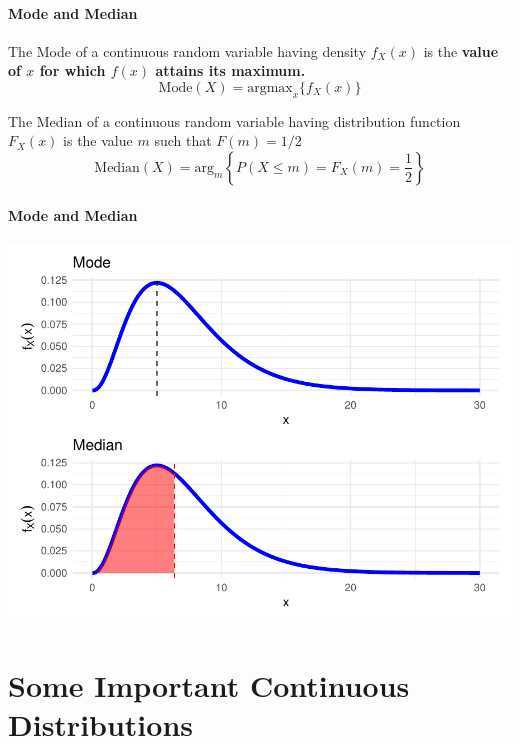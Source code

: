 \documentclass[notes=show,smaller,handout]{beamer}\usepackage[]{graphicx}\usepackage[]{color}
\newenvironment{knitrout}{}{} %
\begin{document}
\begin{frame}{\secname}
\framesubtitle{Mode and Median}
  \begin{definition}[Mode]
    The Mode of a continuous random variable having
    density $f_{X}(x)$ is the \textbf{value of $x$ for which $f(x)$ attains its maximum.}
    $$\text{Mode}(X) = \text{argmax}_{x}\{f_X(x)\}$$
  \end{definition}

  \begin{definition}[Median]
  The Median of a continuous random variable having
  distribution function $F_{X}(x)$ is the value $m$ such that $F(m) = 1/2$
  $$\text{Median}(X) = \text{arg}_{m}\left\{P(X\leq m) = F_X(m) = \frac{1}{2}\right\}$$
  \end{definition}
\end{frame}

\begin{frame}{\secname}
\framesubtitle{Mode and Median}
\begin{knitrout}
\color{fgcolor}

{\centering \includegraphics[width=0.8\linewidth]{figure/unnamed-chunk-8-1} 

}



\end{knitrout}
\end{frame}

\section{Some Important Continuous Distributions}
\end{document}
